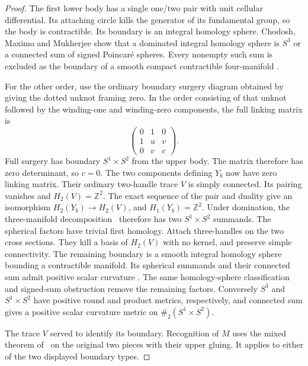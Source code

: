 \documentclass[11pt,letterpaper]{article}
\numberwithin{equation}{section}
\newcommand{\Z}{\mathbb Z}
\begin{document}
\begin{proof}
The first lower body has a single one/two pair with unit cellular
differential. Its attaching circle kills the generator of its
fundamental group, so the body is contractible. Its boundary is an
integral homology sphere. Chodosh, Maximo and Mukherjee show that a
dominated integral homology sphere is \(S^3\) or a connected sum of
signed Poincar\'e spheres. Every nonempty such sum is excluded as the
boundary of a smooth compact contractible four-manifold
\cite[Corollary 2.3 and Proposition 4.2]{ChodoshMaximoMukherjee2024Complete}.

For the other order, use the ordinary boundary surgery diagram obtained
by giving the dotted unknot framing zero. In the order consisting of
that unknot followed by the winding-one and winding-zero components,
the full linking matrix is
\[
 \begin{pmatrix}0&1&0\\1&u&v\\0&v&c\end{pmatrix}.
\]
Full surgery has boundary \(S^1\times S^2\) from the upper body.
The matrix therefore has zero determinant, so \(c=0\). The two components defining \(Y_b\)
now have zero linking matrix. Their ordinary two-handle trace \(V\)
is simply connected. Its pairing vanishes and \(H_2(V)=\Z^2\).
The exact sequence of the pair and duality give an isomorphism
\(H_2(Y_b)\to H_2(V)\), and \(H_1(Y_b)=\Z^2\). Under domination, the
three-manifold decomposition~\cite[Proposition 2.2]{ChodoshMaximoMukherjee2024Complete}
therefore has two \(S^1\times S^2\) summands. The spherical factors
have trivial first homology. Attach three-handles on the two cross
sections. They kill a basis of \(H_2(V)\) with no kernel, and preserve
simple connectivity. The remaining boundary is a smooth integral
homology sphere bounding a contractible manifold. Its spherical
summands and their connected sum admit positive scalar curvature
\cite[Theorem A]{GromovLawson1980Surgery}. The same homology-sphere
classification and signed-sum obstruction remove the remaining
factors. Conversely \(S^3\) and \(S^1\times S^2\) have positive
round and product metrics, respectively, and connected sum gives a
positive scalar curvature metric on \(\#_2(S^1\times S^2)\).

The trace \(V\) served to identify its boundary. Recognition of \(M\)
uses the mixed theorem of~\cite{Baker2026MarkedHeights} on the original
two pieces with their upper gluing. It applies to either of the two
displayed boundary types.
\end{proof}
\end{document}

